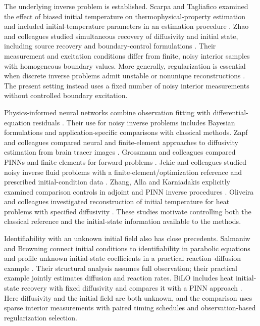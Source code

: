\documentclass[11pt,a4paper]{article}
\begin{document}
The underlying inverse problem is established. Scarpa and Tagliafico examined the effect of biased initial temperature on thermophysical-property estimation and included initial-temperature parameters in an estimation procedure \citep{scarpa2015}. Zhao and colleagues studied simultaneous recovery of diffusivity and initial state, including source recovery and boundary-control formulations \citep{ref002,ref003}. Their measurement and excitation conditions differ from finite, noisy interior samples with homogeneous boundary values. More generally, regularization is essential when discrete inverse problems admit unstable or nonunique reconstructions \citep{ref010,ref011}. The present setting instead uses a fixed number of noisy interior measurements without controlled boundary excitation.

Physics-informed neural networks combine observation fitting with differential-equation residuals \citep{ref001,ref031}. Their use for noisy inverse problems includes Bayesian formulations \citep{ref038} and application-specific comparisons with classical methods. Zapf and colleagues compared neural and finite-element approaches to diffusivity estimation from brain tracer images \citep{ref006}. Grossmann and colleagues compared PINNs and finite elements for forward problems \citep{ref005}. Jekic and colleagues studied noisy inverse fluid problems with a finite-element/optimization reference and prescribed initial-condition data \citep{ref096}. Zhang, Alla and Karniadakis explicitly examined comparison controls in adjoint and PINN inverse procedures \citep{zhang2026}. Oliveira and colleagues investigated reconstruction of initial temperature for heat problems with specified diffusivity \citep{ref004}. These studies motivate controlling both the classical reference and the initial-state information available to the methods.

Identifiability with an unknown initial field also has close precedents. Salmaniw and Browning connect initial conditions to identifiability in parabolic equations and profile unknown initial-state coefficients in a practical reaction--diffusion example \citep{ref076}. Their structural analysis assumes full observation; their practical example jointly estimates diffusion and reaction rates. BiLO includes heat initial-state recovery with fixed diffusivity and compares it with a PINN approach \citep{bilo2026}. Here diffusivity and the initial field are both unknown, and the comparison uses sparse interior measurements with paired timing schedules and observation-based regularization selection.
\end{document}
